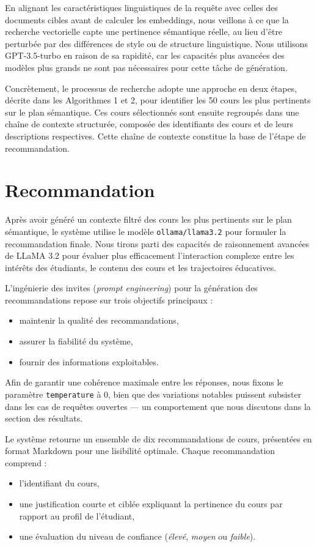 En alignant les caractéristiques linguistiques de la requête avec celles des documents cibles avant de calculer les embeddings, nous veillons à ce que la recherche vectorielle capte une pertinence sémantique réelle, au lieu d’être perturbée par des différences de style ou de structure linguistique. Nous utilisons GPT-3.5-turbo en raison de sa rapidité, car les capacités plus avancées des modèles plus grands ne sont pas nécessaires pour cette tâche de génération.

Concrètement, le processus de recherche adopte une approche en deux étapes, décrite dans les Algorithmes 1 et 2, pour identifier les 50 cours les plus pertinents sur le plan sémantique. Ces cours sélectionnés sont ensuite regroupés dans une chaîne de contexte structurée, composée des identifiants des cours et de leurs descriptions respectives. Cette chaîne de contexte constitue la base de l’étape de recommandation.

\section{Recommandation}

Après avoir généré un contexte filtré des cours les plus pertinents sur le plan sémantique, le système utilise le modèle \texttt{ollama/llama3.2} pour formuler la recommandation finale. Nous tirons parti des capacités de raisonnement avancées de LLaMA 3.2 pour évaluer plus efficacement l'interaction complexe entre les intérêts des étudiants, le contenu des cours et les trajectoires éducatives.

L’ingénierie des invites (\textit{prompt engineering}) pour la génération des recommandations repose sur trois objectifs principaux :
\begin{itemize}
    \item maintenir la qualité des recommandations,
    \item assurer la fiabilité du système,
    \item fournir des informations exploitables.
\end{itemize}

Afin de garantir une cohérence maximale entre les réponses, nous fixons le paramètre \texttt{temperature} à 0, bien que des variations notables puissent subsister dans les cas de requêtes ouvertes --- un comportement que nous discutons dans la section des résultats.

Le système retourne un ensemble de dix recommandations de cours, présentées en format Markdown pour une lisibilité optimale. Chaque recommandation comprend :
\begin{itemize}
    \item l’identifiant du cours,
    \item une justification courte et ciblée expliquant la pertinence du cours par rapport au profil de l’étudiant,
    \item une évaluation du niveau de confiance (\textit{élevé}, \textit{moyen} ou \textit{faible}).
\end{itemize}

